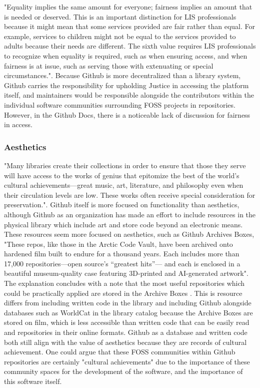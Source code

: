 "Equality implies the same amount for everyone; fairness implies an amount that is needed or deserved. This is an important distinction for LIS professionals because it might mean that some services provided are fair rather than equal. For example, services to children might not be equal to the services provided to adults because their needs are different. The sixth value requires LIS professionals to recognize when equality is required, such as when ensuring access, and when fairness is at issue, such as serving those with extenuating or special circumstances."\cite{rubin2016foundationslis}. Because Github is more decentralized than a library system, Github carries the responsibility for upholding Justice in accessing the platform itself, and maintainers would be responsible alongside the contributors within the individual software communities surrounding FOSS projects in repositories. However, in the Github Docs, there is a noticeable lack of discussion for fairness in access. 

\subsubsection{Aesthetics}

"Many libraries create their collections in order to ensure that those they serve will have access to the works of genius that epitomize the best of the world’s cultural achievements—great music, art, literature, and philosophy even when their circulation levels are low. These works often receive special consideration for preservation."\cite{rubin2016foundationslis}. Github itself is more focused on functionality than aesthetics, although Github as an organization has made an effort to include resources in the physical library which include art and store code beyond an electronic means. These resources seem more focused on aesthetics, such as Github Archives Boxes, "These repos, like those in the Arctic Code Vault, have been archived onto hardened film built to endure for a thousand years. Each includes more than 17,000 repositories—open source’s “greatest hits”— and each is enclosed in a beautiful museum-quality case featuring 3D-printed and AI-generated artwork"\cite{githubarchiveboxes}. The explanation concludes with a note that the most useful repositories which could be practically applied are stored in the Archive Boxes \cite{githubarchiveboxes}. This is resource differs from including written code in the library and including Github alongside databases such as WorldCat in the library catalog because the Archive Boxes are stored on film, which is less accessible than written code that can be easily read and repositories in their online formats. Github as a database and written code both still align with the value of aesthetics because they are records of cultural achievement. One could argue that these FOSS communities within Github repositories are certainly "cultural achievements" due to the importance of these community spaces for the development of the software, and the importance of this software itself.  


